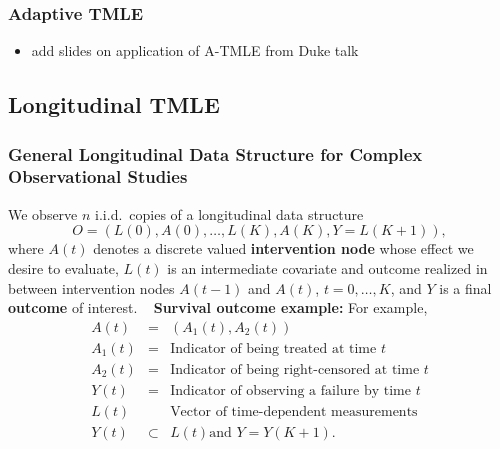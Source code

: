 \documentclass[t]{beamer}
\begin{document}
\begin{frame}
\frametitle{Adaptive TMLE}
\begin{itemize}
  \item add slides on application of A-TMLE from Duke talk
\end{itemize}
\end{frame}


\subsection{Longitudinal TMLE}

\begin{frame}
\frametitle{General Longitudinal Data Structure for Complex Observational Studies}
We observe $n$ i.i.d.~copies of a longitudinal data structure
\[
O=(L(0),A(0),\ldots,L(K),A(K),Y=L(K+1)),\]
where $A(t)$ denotes a discrete valued {\bf intervention node} whose effect we
desire to evaluate,  $L(t)$ is an intermediate covariate and outcome realized in
between intervention nodes $A(t-1)$ and $A(t)$, $t=0,\ldots,K$, and $Y$ is
a final {\bf outcome} of interest.
\ \newline
{\bf Survival outcome example:}
For example,
\begin{eqnarray*}
A(t)&=&(A_1(t),A_2(t))\\
A_1(t)&=& \mbox{Indicator of being treated at time $t$}\\
A_2(t)&=& \mbox{Indicator of being right-censored at time $t$}\\
Y(t)&=&\mbox{Indicator of observing a failure by time $t$}\\
L(t)&&\mbox{Vector of time-dependent measurements}\\
Y(t)&\subset& L(t)\mbox{and  $Y=Y(K+1)$}.
\end{eqnarray*}
\end{frame}
\end{document}
